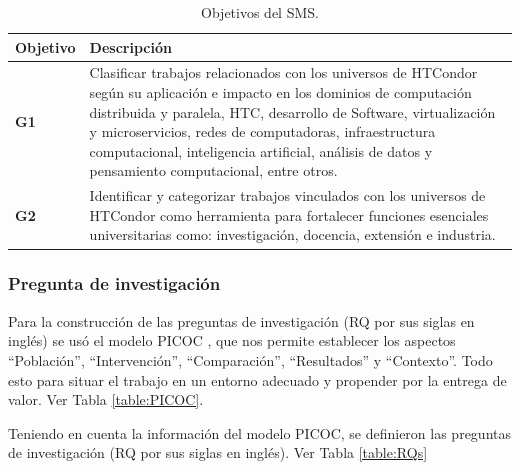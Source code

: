 \begin{table}[htbp]
	\centering
	\caption{Objetivos del SMS.}
	\label{table:Goals}
	\renewcommand{\arraystretch}{1}  %
	\begin{tabular}{p{1cm}p{6.8cm}}
		\toprule
		\textbf{Objetivo}  & \textbf{Descripción}                \\
		\midrule
		\textbf{G1} & Clasificar trabajos relacionados con los universos de HTCondor según su aplicación e impacto en los dominios de computación distribuida y paralela, HTC, desarrollo de Software, virtualización y microservicios, redes de computadoras, infraestructura computacional, inteligencia artificial, análisis de datos y pensamiento computacional, entre otros.\\
		\addlinespace[0.8em]
		\textbf{G2}      & Identificar y categorizar trabajos vinculados con los universos de HTCondor como herramienta para fortalecer funciones esenciales universitarias como: investigación, docencia, extensión e industria.\\
		\bottomrule
	\end{tabular}
\end{table}

\subsubsection{Pregunta de investigación}
Para la construcción de las preguntas de investigación (RQ por sus siglas en inglés) se usó el modelo PICOC \cite{Needleman20026, Petticrew2008systematic}, que nos permite establecer los aspectos ``Población'', ``Intervención'', ``Comparación'', ``Resultados'' y ``Contexto''. Todo esto para situar el trabajo en un entorno adecuado y propender por la entrega de valor. Ver Tabla \ref{table:PICOC}.

Teniendo en cuenta la información del modelo PICOC, se definieron las preguntas de investigación (RQ por sus siglas en inglés). Ver Tabla \ref{table:RQs}

